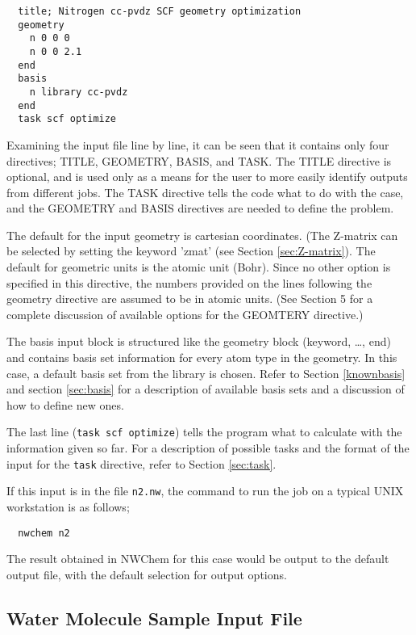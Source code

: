 \begin{verbatim}
  title; Nitrogen cc-pvdz SCF geometry optimization
  geometry 
    n 0 0 0
    n 0 0 2.1
  end
  basis
    n library cc-pvdz
  end
  task scf optimize
\end{verbatim}

Examining the input file line by line, it can be seen that it contains 
only four directives; TITLE, GEOMETRY, BASIS, and TASK.  The TITLE directive
is optional, and is used only as a means for the user to more easily identify
outputs from different jobs.  The TASK directive tells the code what to
do with the case, and the GEOMETRY and BASIS directives are needed
to define the problem.

The default for the input geometry is cartesian coordinates.  (The Z-matrix
can be selected by setting the keyword 'zmat' (see Section \ref{sec:Z-matrix}).
The default for geometric units is the atomic unit (Bohr).  Since no other
option is specified in this directive, the numbers provided on the lines
following the geometry directive are assumed to be in atomic units.
(See Section 5 for a complete discussion of available options for the 
GEOMTERY directive.) 

The basis input block is structured like the geometry block (keyword,
\ldots, end) and contains basis set information for every atom type in
the geometry. In this case, a default basis set from the library is
chosen.  Refer to Section \ref{knownbasis} and section \ref{sec:basis} 
for a description of available basis sets and a discussion of how to define
new ones.

The last line ({\tt task scf optimize})
tells the program what to calculate with the information given so
far. For a description of possible tasks and the format of the input
for the {\tt task} directive, refer to Section \ref{sec:task}.

If this input is in the file \verb+n2.nw+, the command to run the job on
a typical UNIX workstation is as follows;

\begin{verbatim}
  nwchem n2
\end{verbatim}

The result obtained in NWChem for this case would be output to the
default output file, with the default selection for output options.

\subsection{Water Molecule Sample Input File}
\label{sec:realsample}

